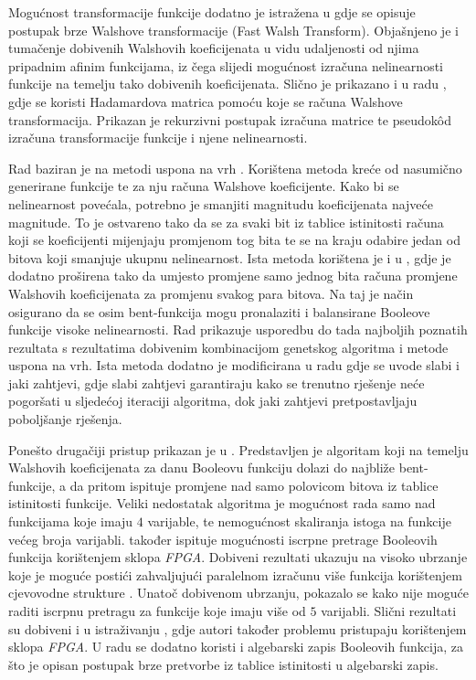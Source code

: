 Mogućnost transformacije funkcije dodatno je istražena u \cite{MeasuringBoolean} gdje se opisuje postupak brze Walshove transformacije \engl(Fast Walsh Transform).
Objašnjeno je i tumačenje dobivenih Walshovih koeficijenata u vidu udaljenosti od njima pripadnim afinim funkcijama, iz čega slijedi mogućnost izračuna nelinearnosti funkcije na temelju tako dobivenih koeficijenata.
Slično je prikazano i u radu \cite{CalculatingNonlinearity}, gdje se koristi Hadamardova matrica pomoću koje se računa Walshove transformacija.
Prikazan je rekurzivni postupak izračuna matrice te pseudok\^{o}d izračuna transformacije funkcije i njene nelinearnosti.

Rad \cite{millan1997smart} baziran je na metodi uspona na vrh .
Korištena metoda kreće od nasumično generirane funkcije te za nju računa Walshove koeficijente.
Kako bi se nelinearnost povećala, potrebno je smanjiti magnitudu koeficijenata najveće magnitude.
To je ostvareno tako da se za svaki bit iz tablice istinitosti računa koji se koeficijenti mijenjaju promjenom tog bita te se na kraju odabire jedan od bitova koji smanjuje ukupnu nelinearnost.
Ista metoda korištena je i u \cite{millan1997effective}, gdje je dodatno proširena tako da umjesto promjene samo jednog bita računa promjene Walshovih koeficijenata za promjenu svakog para bitova.
Na taj je način osigurano da se osim bent-funkcija mogu pronalaziti i balansirane Booleove funkcije visoke nelinearnosti.
Rad \cite{millan1998heuristic} prikazuje usporedbu do tada najboljih poznatih rezultata s rezultatima dobivenim kombinacijom genetskog algoritma i metode uspona na vrh.
Ista metoda dodatno je modificirana u radu \cite{millan1999boolean} gdje se uvode slabi  i jaki  zahtjevi, gdje slabi zahtjevi garantiraju kako se trenutno rješenje neće pogoršati u sljedećoj iteraciji algoritma, dok jaki zahtjevi pretpostavljaju poboljšanje rješenja.

Ponešto drugačiji pristup prikazan je u \cite{DiscoveryOfBent}.
Predstavljen je algoritam koji na temelju Walshovih koeficijenata za danu Booleovu funkciju dolazi do najbliže bent-funkcije, a da pritom ispituje promjene nad samo polovicom bitova iz tablice istinitosti funkcije.
Veliki nedostatak algoritma je mogućnost rada samo nad funkcijama koje imaju $4$ varijable, te nemogućnost skaliranja istoga na funkcije većeg broja varijabli.
\cite{DiscoveryOfBent} također ispituje mogućnosti iscrpne pretrage Booleovih funkcija korištenjem sklopa \textit{FPGA}.
Dobiveni rezultati ukazuju na visoko ubrzanje koje je moguće postići zahvaljujući paralelnom izračunu više funkcija korištenjem cjevovodne strukture .
Unatoč dobivenom ubrzanju, pokazalo se kako nije moguće raditi iscrpnu pretragu za funkcije koje imaju više od $5$ varijabli.
Slični rezultati su dobiveni i u istraživanju \cite{EnumerationOfBentBoolean}, gdje autori također problemu pristupaju korištenjem sklopa \textit{FPGA}.
U radu se dodatno koristi i algebarski zapis Booleovih funkcija, za što je opisan postupak brze pretvorbe iz tablice istinitosti u algebarski zapis.

